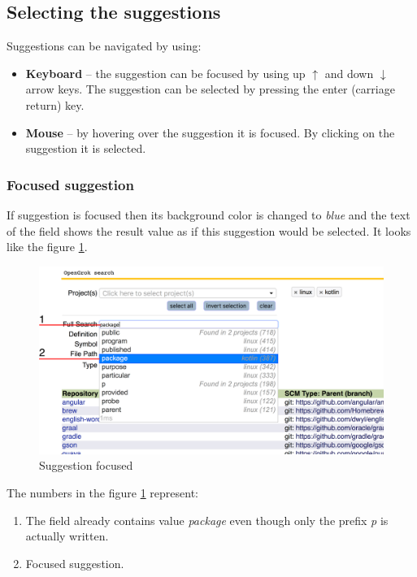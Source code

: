\subsection{Selecting the suggestions}
Suggestions can be navigated by using:
\begin {itemize}
    \item \textbf{Keyboard} – the suggestion can be focused by using up $\uparrow$ and down $\downarrow$ arrow keys.
    The suggestion can be selected by pressing the enter (carriage return) key.
    \item \textbf{Mouse} – by hovering over the suggestion it is focused. By clicking on the suggestion it
    is selected.
\end{itemize}

\subsubsection{Focused suggestion}
If suggestion is focused then its background color is changed to \textit{blue} and the text of the field shows the result
value as if this suggestion would be selected. It looks like the figure \ref{suggestion_focused}.

\begin{figure}[htbp]
    \centering
    \includegraphics[width=145mm]{../img/suggestions_focused.png}
    \caption{Suggestion focused}
    \label{suggestion_focused}
\end{figure}

The numbers in the figure \ref{suggestion_focused} represent:
\begin{enumerate}
    \item The field already contains value \textit{package} even though only the prefix \textit{p} is actually written.
    \item Focused suggestion.
\end{enumerate}

